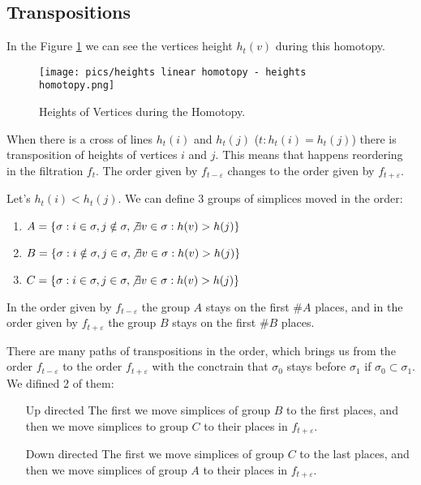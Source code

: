 \documentclass{article}
\begin{document}
\subsection{Transpositions}
\par In the Figure \ref{fig:homotopy} we can see the vertices height $h_t(v)$ during this homotopy. 
\begin{figure}[h!]
    \centering
    \texttt{[image: pics/heights linear homotopy - heights homotopy.png]}
    \caption{Heights of Vertices during the Homotopy.}
    \label{fig:homotopy}
\end{figure}
\par When there is a cross of lines $h_t(i)$ and $h_t(j)$ ($t: h_t(i) = h_t(j)$) there is transposition of heights of vertices $i$ and $j$. This means that happens reordering in the filtration $f_t$. The order given by $f_{t - \varepsilon}$ changes to the order given by $f_{t + \varepsilon}$.
\par Let's $h_t(i) < h_t(j)$. We can define 3 groups of simplices moved in the order:
\begin{enumerate}
    \item $A = \{\sigma: i \in \sigma, j\notin \sigma, \not\exists v\in \sigma: h(v) > h(j)\}$
    \item $B = \{\sigma: i \notin \sigma, j\in \sigma, \not\exists v\in \sigma: h(v) > h(j)\}$
    \item $C = \{\sigma: i \in \sigma, j\in \sigma, \not\exists v\in \sigma: h(v) > h(j)\}$
\end{enumerate}

In the order given by $f_{t - \varepsilon}$ the group $A$ stays on the first $\#A$ places, and in the order given by $f_{t + \varepsilon}$ the group $B$ stays on the first $\#B$ places.
\par There are many paths of transpositions in the order, which brings us from the order $f_{t - \varepsilon}$ to the order $f_{t + \varepsilon}$ with the conctrain that $\sigma_0$ stays before $\sigma_1$ if $\sigma_0 \subset \sigma_1$. We difined 2 of them:
\begin{itemize}
    \item[Up directed] The first we move simplices of group $B$ to the first places, and then we move simplices to group $C$ to their places in $f_{t + \varepsilon}$.
    \item[Down directed] The first we move simplices of group $C$ to the last places, and then we move simplices of group $A$ to their places in $f_{t + \varepsilon}$.
\end{itemize}
\newpage
\end{document}
